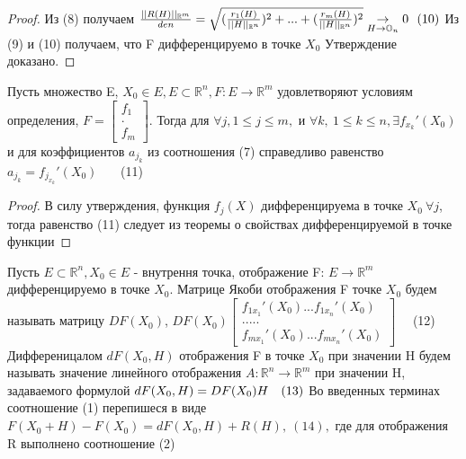 \begin{proof}
	Из (8) получаем $\frac{||R(H)||_{\mathbb{R}^m}}{den} = \sqrt{(\frac{r_1(H)}{||H||_{\mathbb{R}^n}})^2 +...+(\frac{r_m(H)}{||H||_{\mathbb{R}^n}})^2} \underset{H \to \mathbb{O}_n}{\to} 0 \ \ (10) \\$
	Из (9) и (10) получаем, что F дифференцируемо в точке $X_0$ Утверждение доказано.  
\end{proof}
\begin{corollary}
	Пусть множество E, $X_0 \in E, E \subset \mathbb{R}^n, F: E \to \mathbb{R}^m$ удовлетворяют условиям определения, $F = \begin{bmatrix} f_1 \\ .\\ f_m \end{bmatrix}$. Тогда для $\forall j, 1\leq j \leq m,$ и $\forall k,\ 1\leq k \leq n, \exists f_{x_k}'(X_0)$ и для коэффициентов $a_{j_k}$ из соотношения (7) справедливо равенство $a_{j_k}=f_{j_{x_k}}'(X_0)$ \ \ \ (11)
\end{corollary}
\begin{proof}
	В силу утверждения, функция $f_j(X) $ дифференцируема в точке $X_0 \ \forall j$, тогда равенство (11) следует из теоремы о свойствах дифференцируемой в точке функции
\end{proof}
\begin{definition}
	Пусть $E \subset \mathbb{R}^n, X_0 \in E$ - внутрення точка, отображение F: $E \to \mathbb{R}^m$ дифференцируемо в точке $X_0$. Матрице Якоби отображения F  точке $X_0$ будем называть матрицу $DF(X_0)$, $DF(X_0) \begin{bmatrix} f_{1x_1}'(X_0)... f_{1x_n}'(X_0) \\ . . . . . \\ f_{mx_1}'(X_0)...f_{mx_n}'(X_0) \end{bmatrix}$ \ \ (12) \\
	Дифференицалом $dF(X_0,H)$ отображения F в точке $X_0$ при значении H будем называть значение линейного отображения $A: \mathbb{R}^n \to \mathbb{R}^m$ при значении H, задаваемого формулой $dF(X_0,H) = DF(X_0)H \ \  \ (13) \\$
	Во введенных терминах соотношение (1) перепишеся в виде $F(X_0 + H) -F(X_0) = dF(X_0,H) + R(H), \ (14),$ где для отображения R выполнено соотношение (2) 
\end{definition}
